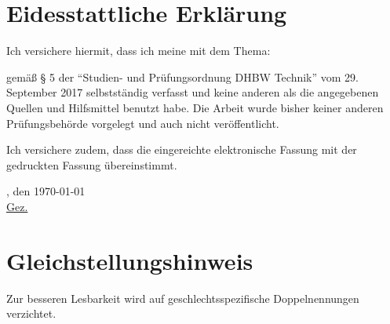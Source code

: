 \section*{Eidesstattliche Erklärung}
Ich versichere hiermit, dass ich meine \arbeit{} mit dem Thema:
\begin{quote}
	\textit{\titel}
\end{quote} 
gemäß § 5 der \enquote{Studien- und Prüfungsordnung DHBW Technik} vom 29. September 2017 selbstständig verfasst und keine anderen als die angegebenen Quellen und Hilfsmittel benutzt habe. Die Arbeit wurde bisher keiner anderen Prüfungsbehörde vorgelegt und auch nicht veröffentlicht.

\vspace{0.25cm}

Ich versichere zudem, dass die eingereichte elektronische Fassung mit der gedruckten Fassung übereinstimmt.

\vspace{1cm}

\verfassungsort, den \today \\[0.5cm]
	{\underline{Gez. \autor}}
	{\makebox[6cm]{\hrulefill}}\\ 
\autorReverse

\vspace*{\fill}

\section*{Gleichstellungshinweis}

Zur besseren Lesbarkeit wird auf geschlechtsspezifische Doppelnennungen verzichtet.
